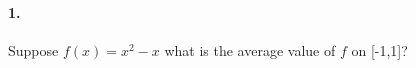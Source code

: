 


\renewcommand\assignment{Homework Set I, Due Monday, January 23rd, 2023}



    \iffalse
    \begin{equation*}
        \begin{gathered}
            Equations go here.
        \end{gathered}
    \end{equation*}

    \resizebox{\hsize}{!}{$Long equation goes here$}

    \begin{multicol*}{# of columns}
    \end{multicol*}

    \horizontal

    \fi


    \paragraph*{1.}
    Suppose $f(x) = x^2-x$ what is the average value of $f$ on [-1,1]?

